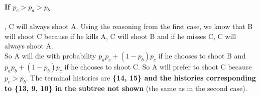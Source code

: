 \documentclass[a4paper]{article}
\begin{document}
\paragraph{If $p_c > p_a > p_b$}, C will always shoot A. Using the reasoning 
from the first case, we know that B will shoot C because if he kills A, C
will shoot B and if he misses C, C will always shoot A.\\

So A will die with probability $p_ap_c + (1-p_b)p_c$ if he chooses to shoot B
and $p_ap_b + (1-p_b)p_c$ if he chooses to shoot C. So A will prefer to shoot C
because $p_c > p_b$. The terminal histories are \textbf{\{14, 15\} and the 
histories corresponding to \{13, 9, 10\} in the subtree not shown} (the same
as in the second case).
\end{document}
